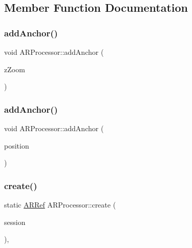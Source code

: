 \subsection{Member Function Documentation}
\mbox{\label{class_a_r_processor_a6b6efec29e190aebd01bb770b6c218ed}} 
\subsubsection{\texorpdfstring{add\+Anchor()}{addAnchor()}\hspace{0.1cm}{\footnotesize\ttfamily [1/2]}}
{\footnotesize\ttfamily void A\+R\+Processor\+::add\+Anchor (\begin{DoxyParamCaption}\item[{float}]{z\+Zoom }\end{DoxyParamCaption})}

\mbox{\label{class_a_r_processor_af4e627093ee86883736c89c2a627af42}} 
\subsubsection{\texorpdfstring{add\+Anchor()}{addAnchor()}\hspace{0.1cm}{\footnotesize\ttfamily [2/2]}}
{\footnotesize\ttfamily void A\+R\+Processor\+::add\+Anchor (\begin{DoxyParamCaption}\item[{of\+Vec3f}]{position }\end{DoxyParamCaption})}

\mbox{\label{class_a_r_processor_affa1cf36e94e3015c436fd30626dd773}} 
\subsubsection{\texorpdfstring{create()}{create()}}
{\footnotesize\ttfamily static \hyperlink{_a_r_processor_8h_aa8c5643290d0692cc71388c3f0f1623a}{A\+R\+Ref} A\+R\+Processor\+::create (\begin{DoxyParamCaption}\item[{A\+R\+Session $\ast$}]{session }\end{DoxyParamCaption})\hspace{0.3cm}{\ttfamily [inline]}, {\ttfamily [static]}}




